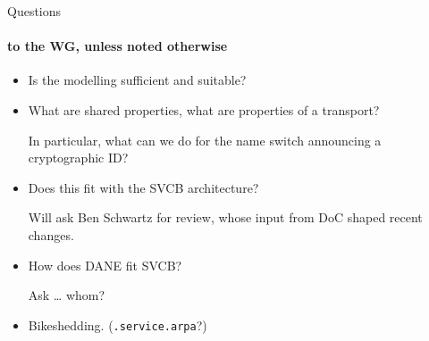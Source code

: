 \begin{frame}{Questions}\framesubtitle{to the WG, unless noted otherwise}\large
    \begin{itemize}
        \item Is the modelling sufficient and suitable?
        \item What are shared properties, what are properties of a transport? %

          {\footnotesize In particular, what can we do for the name switch announcing a cryptographic ID?}
        \item Does this fit with the SVCB architecture?

          {\footnotesize Will ask Ben Schwartz for review, whose input from DoC shaped recent changes.}
        \item How does DANE fit SVCB? %

          {\footnotesize Ask … whom?}
        \item Bikeshedding. (\texttt{.service.arpa}?)
    \end{itemize}
\end{frame}


